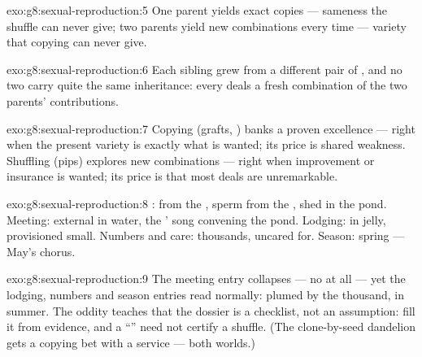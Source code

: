 \begin{solution}{exo:g8:sexual-reproduction:5}
One parent yields exact copies --- sameness the shuffle can
never give; two parents yield new combinations every time
--- variety that copying can never give.
\end{solution}

\begin{solution}{exo:g8:sexual-reproduction:6}
Each sibling grew from a different pair of , and no
two  carry quite the same inheritance: every
 deals a fresh combination of the two parents'
contributions.
\end{solution}

\begin{solution}{exo:g8:sexual-reproduction:7}
Copying (grafts, ) banks a proven excellence ---
right when the present variety is exactly what is wanted;
its price is shared weakness. Shuffling (pips) explores new
combinations --- right when improvement or insurance is
wanted; its price is that most deals are unremarkable.
\end{solution}

\begin{solution}{exo:g8:sexual-reproduction:8}
:  from the , sperm from the , shed
in the pond. Meeting: external  in water, the
' song convening the pond. Lodging:  in jelly,
provisioned small. Numbers and care: thousands, uncared
for. Season: spring --- May's chorus.
\end{solution}

\begin{solution}{exo:g8:sexual-reproduction:9}
The meeting entry collapses --- no  at all
--- yet the lodging, numbers and season entries read
normally: plumed  by the thousand, in summer. The
oddity teaches that the dossier is a checklist, not an
assumption: fill it from evidence, and a ``'' need not
certify a shuffle. (The clone-by-seed dandelion gets a
copying bet with a  service --- both worlds.)
\end{solution}


